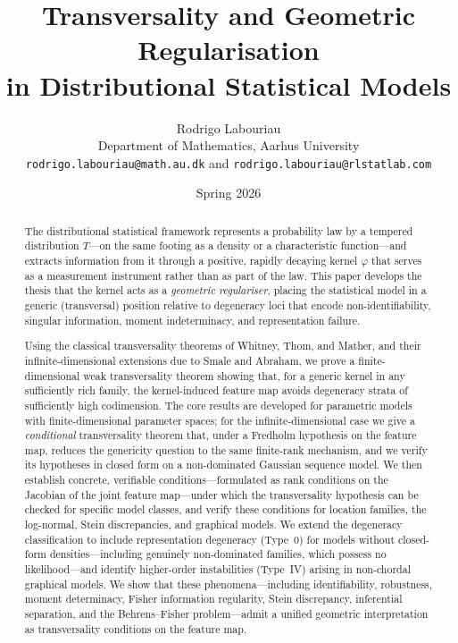 \documentclass[11pt,a4paper]{article}
\title{Transversality and Geometric Regularisation\\
in Distributional Statistical Models}
\author{Rodrigo Labouriau\\[4pt]
\small Department of Mathematics, Aarhus University\\
\small \texttt{rodrigo.labouriau@math.au.dk} and
\small \texttt{rodrigo.labouriau@rlstatlab.com}}
\date{Spring 2026}
\begin{document}
\maketitle

\begin{abstract}
The distributional statistical framework represents a probability law by a
tempered distribution $T$---on the same footing as a density or a
characteristic function---and extracts information from it through a positive,
rapidly decaying kernel $\varphi$ that serves as a measurement instrument
rather than as part of the law.  This paper develops the thesis that the kernel acts
as a \emph{geometric regulariser}, placing the statistical model in a
generic (transversal) position relative to degeneracy loci that encode
non-identifiability, singular information, moment indeterminacy, and
representation failure.

Using the classical transversality theorems of Whitney, Thom, and
Mather, and their infinite-dimensional extensions due to Smale and
Abraham, we prove a finite-dimensional weak transversality theorem
showing that, for a generic kernel in any sufficiently rich family,
the kernel-induced feature map avoids degeneracy strata of
sufficiently high codimension.  The core results are developed for
parametric models with finite-dimensional parameter spaces; for the
infinite-dimensional case we give a \emph{conditional} transversality
theorem that, under a Fredholm hypothesis on the feature map, reduces the
genericity question to the same finite-rank mechanism, and we verify its
hypotheses in closed form on a non-dominated Gaussian sequence model.  We then establish concrete,
verifiable conditions---formulated as rank conditions on the
Jacobian of the joint feature map---under which the transversality
hypothesis can be checked for specific model classes, and verify
these conditions for location families, the log-normal, Stein
discrepancies, and graphical models.  We extend the degeneracy
classification to include representation degeneracy (Type~0) for
models without closed-form densities---including genuinely non-dominated
families, which possess no likelihood---and identify higher-order
instabilities (Type~IV) arising in non-chordal graphical models.
We show that these phenomena---including identifiability, robustness,
moment determinacy, Fisher information regularity, Stein discrepancy,
inferential separation, and the Behrens--Fisher problem---admit a
unified geometric interpretation as transversality conditions on the
feature map.


\end{abstract}
\end{document}
